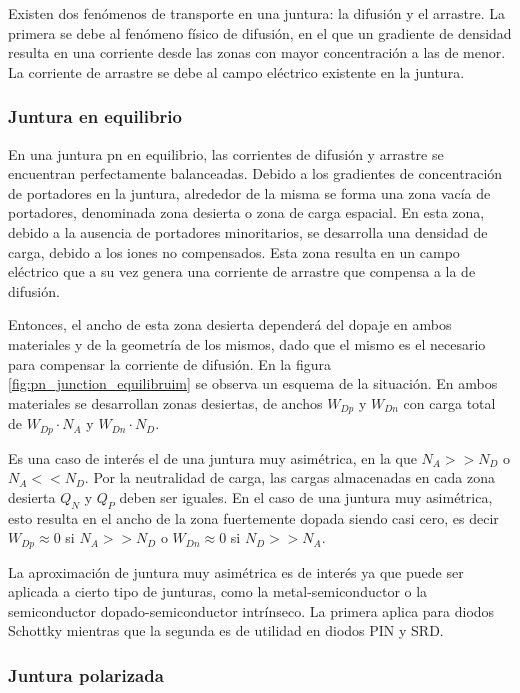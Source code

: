 Existen dos fenómenos de transporte en una juntura: la difusión y el arrastre.
La primera se debe al fenómeno físico de difusión, en el que un gradiente de
densidad resulta en una corriente desde las zonas con mayor concentración a las
de menor. La corriente de arrastre se debe al campo eléctrico existente en la
juntura.

\subsubsection{Juntura en equilibrio}
\label{sec:pn_junction_equilibruim}

En una juntura pn en equilibrio, las corrientes de difusión y arrastre se
encuentran perfectamente balanceadas. Debido a los gradientes de concentración
de portadores en la juntura, alrededor de la misma se forma una zona vacía de
portadores, denominada zona desierta o zona de carga espacial. En esta zona,
debido a la ausencia de portadores minoritarios, se desarrolla una densidad de
carga, debido a los iones no compensados. Esta zona resulta en un campo
eléctrico que a su vez genera una corriente de arrastre que compensa a la de
difusión.

Entonces, el ancho de esta zona desierta dependerá del dopaje en ambos
materiales y de la geometría de los mismos, dado que el mismo es el necesario
para compensar la corriente de difusión. En la figura
\ref{fig:pn_junction_equilibruim} se observa un esquema de la situación. En
ambos materiales se desarrollan zonas desiertas, de anchos $W_{Dp}$ y $W_{Dn}$
con carga total de $W_{Dp} \cdot N_A$ y $W_{Dn} \cdot N_D$.

Es una caso de interés el de una juntura muy asimétrica, en la que $N_A >> N_D$
o $N_A << N_D$. Por la neutralidad de carga, las cargas almacenadas en cada zona
desierta $Q_N$ y $Q_P$ deben ser iguales. En el caso de una juntura muy
asimétrica, esto resulta en el ancho de la zona fuertemente dopada siendo casi
cero, es decir $W_{Dp} \approx 0$ si $N_A >> N_D$ o $W_{Dn} \approx 0$ si $N_D
>> N_A$.

La aproximación de juntura muy asimétrica es de interés ya que puede ser
aplicada a cierto tipo de junturas, como la metal-semiconductor o la
semiconductor dopado-semiconductor intrínseco. La primera aplica para diodos
Schottky mientras que la segunda es de utilidad en diodos PIN y SRD.

\subsubsection{Juntura polarizada}

